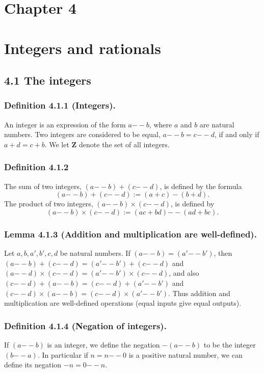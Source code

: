 \documentclass[12pt, letter]{article}
\begin{document}
\section*{Chapter 4}
\section*{Integers and rationals}
\subsection*{4.1 The integers}
\subsubsection*{Definition 4.1.1 (Integers).}
An integer is an expression of the form $a\mathtt{--}b$, where $a$ and $b$ are natural numbers. Two integers are considered to be equal, 
$a\mathtt{--}b=c\mathtt{--}d$, if and only if $a+d=c+b$. We let $\mathbf{Z}$ denote the set of all integers.
\subsubsection*{Definition 4.1.2}
The sum of two integers, $(a\mathtt{--}b)+(c\mathtt{--}d)$, is defined by the formula
\begin{equation*}
    (a\mathtt{--}b)+(c\mathtt{--}d):=(a+c)-(b+d).
\end{equation*}
The product of two integers, $(a\mathtt{--}b)\times (c\mathtt{--}d)$, is defined by
\begin{equation*}
    (a\mathtt{--}b)\times(c\mathtt{--}d):=(ac+bd)\mathtt{--}(ad+bc).
\end{equation*}
\subsubsection*{Lemma 4.1.3 (Addition and multiplication are well-defined).}
Let $a,b,a',b',c,d$ be natural numbers. If $(a\mathtt{--}b)=(a'\mathtt{--}b')$, then $(a\mathtt{--}b)+(c\mathtt{--}d)=(a'\mathtt{--}b')+(c\mathtt{--}d)$ and 
$(a\mathtt{--}d)\times(c\mathtt{--}d)=(a'\mathtt{--}b')\times(c\mathtt{--}d)$, and also $(c\mathtt{--}d)+(a\mathtt{--}b)=(c\mathtt{--}d)+(a'\mathtt{--}b')$ and $(c\mathtt{--}d)\times(a\mathtt{--}b)=(c\mathtt{--}d)\times(a'\mathtt{--}b')$.
Thus addition and multiplication are well-defined operations (equal inputs give equal outputs).
\subsubsection*{Definition 4.1.4 (Negation of integers).}
If $(a\mathtt{--}b)$ is an integer, we define the negation $-(a\mathtt{--}b)$ to be the integer $(b\mathtt{--}a)$. In particular if $n=n\mathtt{--}0$
is a positive natural number, we can define its negation $-n=0\mathtt{--}n$.
\end{document}
